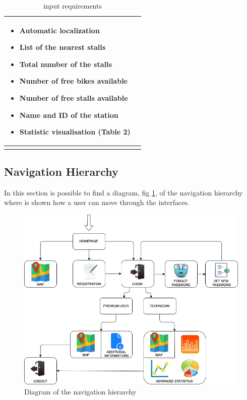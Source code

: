 \documentclass{article}
\begin{document}
\begin{longtable}{|l|p{}|}
\begin{itemize}
            \item Automatic localization
            \item List of the nearest stalls
            \item Total number of the stalls
            \item Number of free bikes available
            \item Number of free stalls available
            \item Name and ID of the station 
            \item Statistic visualisation (Table 2)
            \end{itemize}
            \\
            \hline
\caption{input requirements} \\
\end{longtable}

\subsection{Navigation Hierarchy}
In this section is possible to find a diagram, fig \ref{fig:navigation}, of the navigation hierarchy where is shown how a user can move through the interfaces.\\
\begin{figure}[H]
    \centering
    \includegraphics[width=0.68\linewidth]{image/USERFLOW2.png}
    \caption{Diagram of the navigation hierarchy}
    \label{fig:navigation}
\end{figure}
\end{document}
